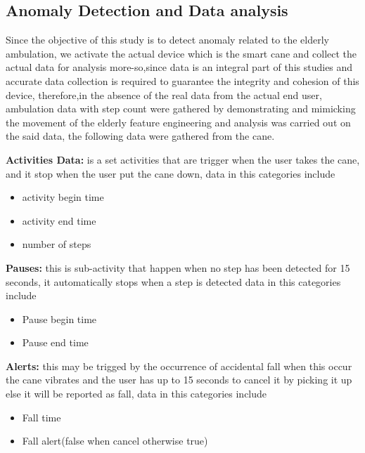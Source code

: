 \documentclass[a4paper, parskip=full]{scrartcl}
\begin{document}
 \subsection*{Anomaly Detection and Data analysis}
 
Since the objective of this study is to detect anomaly related to the elderly ambulation, we activate the actual device which is the smart cane and collect the actual data for analysis more-so,since data is an integral part of this studies and accurate data collection is required to guarantee the integrity and cohesion of this device, therefore,in the absence of the real data from the actual end user, ambulation data with step count were gathered by demonstrating and mimicking the movement of the elderly feature engineering and analysis was carried out on the said data, the following data were gathered from the cane.


\textbf{Activities Data:} is a set activities that are trigger when the user takes the cane, and it stop when the user put the cane down, data in this categories include 


\begin{itemize}
	
	\item   activity begin time
	
	\item  activity end time
	
	\item   number of steps	
	
\end{itemize}

\textbf{Pauses:} this is sub-activity that happen when no step has been detected for 15 seconds, it automatically stops when a step is detected data in this categories include 
\begin{itemize}
	
	\item   Pause begin time
	
	\item   Pause end time	
	
\end{itemize}

\textbf{Alerts:} this may be trigged by the occurrence of accidental fall when this occur the cane vibrates and the user has up to 15 seconds to cancel it by picking it up else it will be reported as fall,  data in this categories include

\begin{itemize}
	\item   Fall time
	
	\item   Fall alert(false when cancel otherwise true)
\end{itemize}
\end{document}

